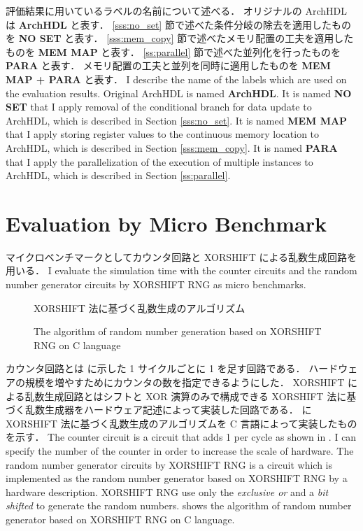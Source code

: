 評価結果に用いているラベルの名前について述べる．
オリジナルの ArchHDL は \textbf{ArchHDL} と表す．
\ref{sss:no_set} 節で述べた条件分岐の除去を適用したものを \textbf{NO SET} と表す．
\ref{sss:mem_copy} 節で述べたメモリ配置の工夫を適用したものを \textbf{MEM MAP} と表す．
\ref{ss:parallel} 節で述べた並列化を行ったものを \textbf{PARA} と表す．
メモリ配置の工夫と並列を同時に適用したものを \textbf{MEM MAP + PARA} と表す．
\fi
I describe the name of the labels which are used on the evaluation results.
Original ArchHDL is named \textbf{ArchHDL}.
It is named \textbf{NO SET} that I apply removal of the conditional branch for data update to ArchHDL, which is described in Section \ref{sss:no_set}.
It is named \textbf{MEM MAP} that I apply storing register values to the continuous memory location to ArchHDL, which is described in Section \ref{sss:mem_copy}.
It is named \textbf{PARA} that I apply the parallelization of the execution of multiple instances to ArchHDL, which is described in Section \ref{ss:parallel}.


\section{Evaluation by Micro Benchmark}

マイクロベンチマークとしてカウンタ回路と XORSHIFT による乱数生成回路を用いる．
\fi
I evaluate the simulation time with the counter circuits and the random number generator circuits by XORSHIFT RNG as micro benchmarks.

\begin{figure}[tb]
 
 \caption{XORSHIFT 法に基づく乱数生成のアルゴリズム}
\fi
 \caption{The algorithm of random number generation based on XORSHIFT RNG on C language}
 \label{src:xorshift_alg}
\end{figure}

カウンタ回路とは  に示した 1 サイクルごとに 1 を足す回路である．
ハードウェアの規模を増やすためにカウンタの数を指定できるようにした．
XORSHIFT による乱数生成回路とはシフトと XOR 演算のみで構成できる XORSHIFT 法に基づく乱数生成器をハードウェア記述によって実装した回路である．
 に XORSHIFT 法に基づく乱数生成のアルゴリズムを C 言語によって実装したものを示す．
\fi
The counter circuit is a circuit that adds 1 per cycle as shown in .
I can specify the number of the counter in order to increase the scale of hardware.
The random number generator circuits by XORSHIFT RNG is a circuit which is implemented as the random number generator based on XORSHIFT RNG by a hardware description.
XORSHIFT RNG use only the \textit{exclusive or} and a \textit{bit shifted} to generate the random numbers.
 shows the algorithm of random number generator based on XORSHIFT RNG on C language.

